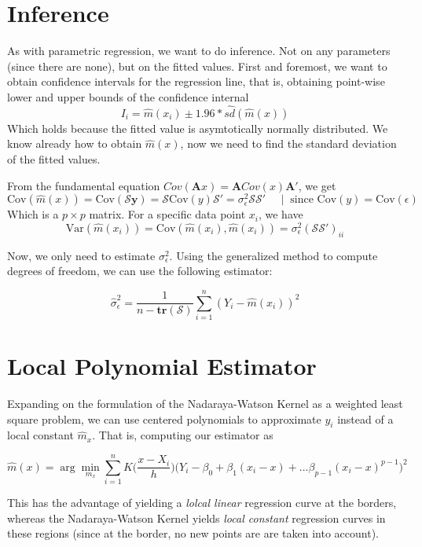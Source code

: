\documentclass[]{book}
\begin{document}
\section{Inference}\label{inference}

As with parametric regression, we want to do inference. Not on any
parameters (since there are none), but on the fitted values. First and
foremost, we want to obtain confidence intervals for the regression
line, that is, obtaining point-wise lower and upper bounds of the
confidence internal
\[ I_i = \hat{m}(x_i) ± 1.96 *\hat{sd}(\hat{m}(x)) \] Which holds
because the fitted value is asymtotically normally distributed. We know
already how to obtain \(\hat{m}(x)\), now we need to find the standard
deviation of the fitted values.

From the fundamental equation
\(Cov(\mathbf{A}x) = \mathbf{A} Cov(x) \mathbf{A}'\), we get
\[ \text{Cov}(\hat{m}(x)) = \text{Cov}(\mathcal{S}\mathbf{y}) = 
\mathcal{S} \text{Cov}(y) \mathcal{S}' = \sigma_\epsilon^2\mathcal{SS}'
\;\;\;\;\;|\;\; \text{since Cov}(y) = \text{Cov}(\epsilon)\] Which is a
\(p\times p\) matrix. For a specific data point \(x_i\), we have
\[ \text{Var}(\hat{m}(x_i))= \text{Cov}(\hat{m}(x_i),  \hat{m}(x_i)) = \sigma_\epsilon^2 (\mathcal{S} \mathcal{S}')_{ii} \]

Now, we only need to estimate \(\sigma^2_\epsilon\). Using the
generalized method to compute degrees of freedom, we can use the
following estimator:

\[ \hat{\sigma}_\epsilon^2 = \frac{1}{n-\textbf{tr}(\mathcal{S})} 
\sum\limits_{i = 1}^n (Y_i - \hat{m}(x_i))^2 \]

\section{Local Polynomial Estimator}\label{local-polynomial-estimator}

Expanding on the formulation of the Nadaraya-Watson Kernel as a weighted
least square problem, we can use centered polynomials to approximate
\(y_i\) instead of a local constant \(\hat{m}_x\). That is, computing
our estimator as

\[\hat{m}(x) = \arg\min\limits_{m_x} \sum\limits_{i = 1}^nK\Big(\frac{x-X_i}{h}\Big)
\big(Y_i-\beta_0 + \beta_1 (x_i -x) + ... \beta_{p-1} (x_i-x)^{p-1}\big)^2 \]

This has the advantage of yielding a \emph{lolcal linear} regression
curve at the borders, whereas the Nadaraya-Watson Kernel yields
\emph{local constant} regression curves in these regions (since at the
border, no new points are are taken into account).
\end{document}
